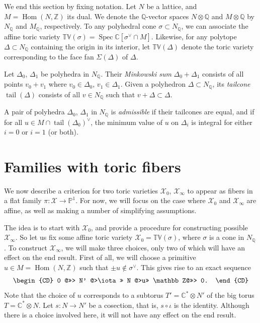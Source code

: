 \documentclass[pdftex]{sigma}
\newcommand{\CC}{\mathbb{C}}
\newcommand{\QQ}{\mathbb{Q}}
\newcommand{\ZZ}{\mathbb Z}
\newcommand{\PP}{\mathbb{P}}
\newcommand{\tv}{\mathbb{TV}}
\newcommand{\cX}{\mathcal{X}}
\DeclareMathOperator{\spec}{Spec}
\DeclareMathOperator{\tail}{tail}
\DeclareMathOperator{\Hom}{Hom}
\begin{document}
We end this section by f\/ixing notation. Let $N$ be a lattice, and $M=\Hom(N,\ZZ)$ its dual. We denote the $\QQ$-vector spaces $N\otimes \QQ$ and $M\otimes \QQ$ by $N_\QQ$ and $M_\QQ$, respectively. To any polyhedral cone $\sigma\subset N_\QQ$, we can associate the af\/f\/ine toric variety $\tv(\sigma)=\spec \CC[\sigma^\vee\cap M]$. Likewise, for any polytope $\Delta\subset N_\QQ$ containing the origin in its interior, let $\tv(\Delta)$ denote the toric variety corresponding to the face fan $\Sigma(\Delta)$ of $\Delta$.

Let $\Delta_0$, $\Delta_1$ be polyhedra in $N_\QQ$. Their \emph{Minkowski sum} $\Delta_0+\Delta_1$ consists of all points $v_0+v_1$ where $v_0\in\Delta_0$, $v_1\in\Delta_1$. Given a polyhedron $\Delta\subset N_\QQ$, its \emph{tailcone} $\tail(\Delta)$ consists of all $v\in N_\QQ$ such that $v+\Delta\subset \Delta$.

\begin{Definition}
A pair of polyhedra $\Delta_0$, $\Delta_1$ in $N_\QQ$ is \emph{admissible} if their tailcones are equal, and if for all $u\in M\cap\tail(\Delta_0)^\vee$, the  minimum value of $u$ on $\Delta_i$ is integral for either $i=0$ or $i=1$ (or both).
\end{Definition}


\section{Families with toric f\/ibers}\label{sec:fam}

We now describe a criterion for two toric varieties $\cX_0$, $\cX_\infty$ to appear as f\/ibers in
a f\/lat family $\pi:\cX\to\PP^1$. For now, we will focus on the case where $\cX_0$ and $\cX_\infty$ are af\/f\/ine, as well as making a number of simplifying assumptions.

The idea is to start with $\cX_0$, and provide a procedure for constructing possible $\cX_\infty$. So let us f\/ix some af\/f\/ine toric variety $\cX_0=\tv(\sigma)$, where $\sigma$ is a cone in $N_\QQ$. To construct $\cX_\infty$, we will make three choices, only two of which will have an ef\/fect on the end result. First of all, we will choose a primitive $u\in M=\Hom(N,\ZZ)$ such that $\pm u\notin\sigma^\vee$. This gives rise to an exact sequence
\begin{gather*}
\begin{CD}
0 @>>> N' @>\iota >> N @>u>> \ZZ @>>> 0.
\end{CD}
\end{gather*}
Note that the choice of $u$ corresponds to a subtorus $T'=\CC^*\otimes N'$ of the big torus $T=\CC^*\otimes N$.
Let $s\colon N\to N'$ be a cosection, that is, $s\circ\iota$ is the identity. Although there is a choice involved here, it will not have any ef\/fect on the end result.
\end{document}
